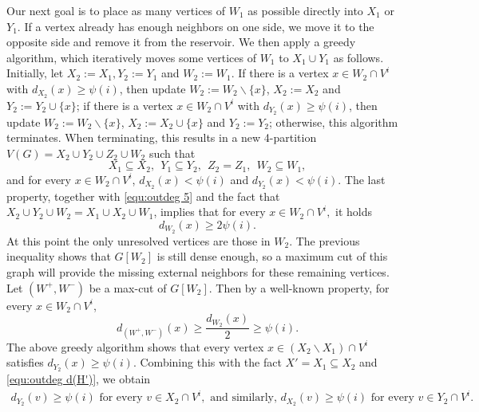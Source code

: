 \documentclass{aic}
\begin{document}
	Our next goal is to place as many vertices of $W_1$ as possible directly into $X_1$ or $Y_1$.
	If a vertex already has enough neighbors on one side, we move it to the opposite side and remove it from the reservoir.
	We then apply a greedy algorithm, which iteratively moves some vertices of $W_1$ to $X_1\cup Y_1$ as follows.
	Initially, let $X_2:=X_1, Y_2:=Y_1$ and $W_2:=W_1$.
	If there is a vertex $x\in W_2\cap V^i$ with $d_{X_2}(x)\ge \psi(i)$,
	then update $W_2:=W_2\backslash \{x\}$, $X_2:=X_2$ and $Y_2:=Y_2\cup \{x\}$;
	if there is a vertex $x\in W_2\cap V^i$ with $d_{Y_2}(x)\geq \psi(i)$,
	then update $W_2:=W_2\backslash \{x\}$, $X_2:=X_2\cup \{x\}$ and $Y_2:=Y_2$;
	otherwise, this algorithm terminates.
	When terminating, this results in a new 4-partition $V(G)=X_2\cup Y_2\cup Z_2\cup W_2$ such that
	$$X_1\subseteq X_2,~~Y_1\subseteq Y_2,~~Z_2=Z_1,~~W_2\subseteq W_1,$$ and for every $x\in W_2\cap V^i$, $d_{X_2}(x)<\psi(i)$ and $d_{Y_2}(x)<\psi(i)$.
	The last property, together with \eqref{equ:outdeg 5} and the fact that $X_2\cup Y_2\cup W_2=X_1\cup X_2\cup W_1$, implies that for every $x\in W_2\cap V^i,$ it holds
	$$d_{W_2}(x)\ge 2\psi(i).$$
	At this point the only unresolved vertices are those in $W_2$.
	The previous inequality shows that $G[W_2]$ is still dense enough, so a maximum cut of this graph will provide the missing external neighbors for these remaining vertices.
	Let $(W^+,W^-)$ be a max-cut of $G[W_2]$.
	Then by a well-known property, for every $x\in W_2\cap V^i$,
	\begin{equation}\label{equ:outdeg maxcut}
		d_{(W^+,W^-)}(x)\geq \frac{d_{W_2}(x)}{2}\geq \psi(i).
	\end{equation}
	The above greedy algorithm shows that every vertex $x\in (X_2\backslash X_1)\cap V^i$ satisfies $d_{Y_2}(x)\ge \psi(i)$.
	Combining this with the fact $X' = X_1 \subseteq X_2$ and \eqref{equ:outdeg d(H')}, we obtain
	\begin{align}\label{equ:X2Y2}
		d_{Y_2}(v)\ge \psi(i) \mbox{ for every } v\in X_2\cap V^i, \mbox{ and similarly, } d_{X_2}(v)\ge \psi(i) \mbox{ for every } v\in Y_2\cap V^i.
	\end{align}
	
\end{document}
